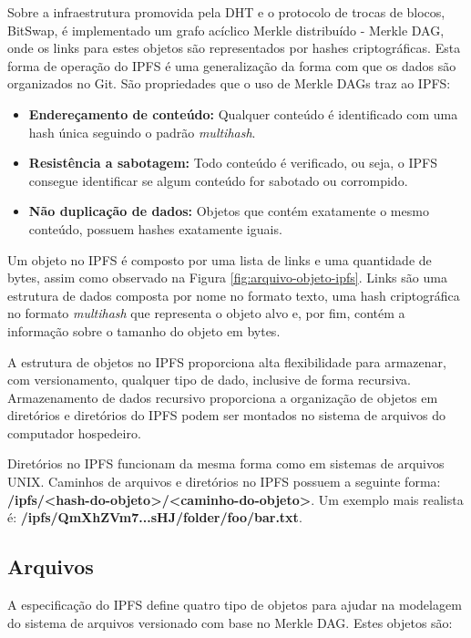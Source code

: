 \documentclass[tcc,capa]{texufpel}
\begin{document}
        Sobre a infraestrutura promovida pela DHT e o protocolo de trocas de blocos, BitSwap, é implementado um grafo acíclico Merkle distribuído - Merkle DAG, onde os links para estes objetos são representados por hashes criptográficas. Esta forma de operação do IPFS é uma generalização da forma com que os dados são organizados no Git. São propriedades que o uso de Merkle DAGs traz ao IPFS:
        
        \begin{itemize}
            \item \textbf{Endereçamento de conteúdo:} Qualquer conteúdo é identificado com uma hash única seguindo o padrão \textit{multihash}.
            \item \textbf{Resistência a sabotagem:} Todo conteúdo é verificado, ou seja, o IPFS consegue identificar se algum conteúdo for sabotado ou corrompido.
            \item \textbf{Não duplicação de dados:} Objetos que contém exatamente o mesmo conteúdo, possuem hashes exatamente iguais.
        \end{itemize}
        
        Um objeto no IPFS é composto por uma lista de links e uma quantidade de bytes, assim como observado na Figura \ref{fig:arquivo-objeto-ipfs}. Links são uma estrutura de dados composta por nome no formato texto, uma hash criptográfica no formato \textit{multihash} que representa o objeto alvo e, por fim, contém a informação sobre o tamanho do objeto em bytes.
        
        A estrutura de objetos no IPFS proporciona alta flexibilidade para armazenar, com versionamento, qualquer tipo de dado, inclusive de forma recursiva. Armazenamento de dados recursivo proporciona a organização de objetos em diretórios e diretórios do IPFS podem ser montados no sistema de arquivos do computador hospedeiro.
        
        Diretórios no IPFS funcionam da mesma forma como em sistemas de arquivos UNIX. Caminhos de arquivos e diretórios no IPFS possuem a seguinte forma: \textbf{/ipfs/<hash-do-objeto>/<caminho-do-objeto>}. Um exemplo mais realista é: \textbf{/ipfs/QmXhZVm7...sHJ/folder/foo/bar.txt}.
        
        \subsection{Arquivos}
        
        A especificação do IPFS define quatro tipo de objetos para ajudar na modelagem do sistema de arquivos versionado com base no Merkle DAG. Estes objetos são:
        
\end{document}
